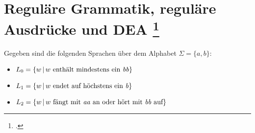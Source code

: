 \documentclass{lehramt-informatik-aufgabe}
\begin{document}
\section{Reguläre Grammatik, reguläre Ausdrücke und DEA
\footcite{theoinf:ab:1}}

Gegeben sind die folgenden Sprachen über dem Alphabet $\Sigma = \{a, b\}$:

\begin{itemize}
\item $L_0 = \{w \,|\, w \text{ enthält mindestens ein \emph{bb}}\}$
\item $L_1 = \{w \,|\, w \text{ endet auf höchstens ein \emph{b}}\}$
\item $L_2 = \{w \,|\, w \text{ fängt mit \emph{aa} an oder hört mit \emph{bb} auf}\}$
\end{itemize}
\end{document}
